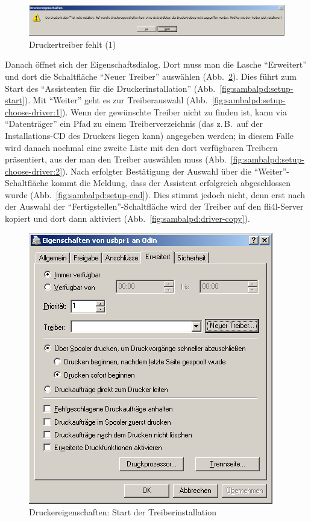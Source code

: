 \begin{figure}[hbt!]
\centering
\includegraphics[width=\columnwidth]{image008}
\caption{Druckertreiber fehlt (1)}
\label{fig:sambalpd:no-driver:1}
\end{figure}

Danach öffnet sich der Eigenschaftsdialog. Dort muss man
die Lasche ``Erweitert'' und dort die Schaltfläche ``Neuer Treiber'' auswählen
(Abb.~\ref{fig:sambalpd:props-start-setup}). Dies führt zum Start des
``Assistenten für die Druckerinstallation''
(Abb.~\ref{fig:sambalpd:setup-start}). Mit ``Weiter'' geht es zur
Treiberauswahl (Abb.~\ref{fig:sambalpd:setup-choose-driver:1}). Wenn der
gewünschte Treiber nicht zu finden ist, kann via ``Datenträger'' ein Pfad zu
einem Treiberverzeichnis (das z.\,B.\ auf der Installations-CD des Druckers
liegen kann) angegeben werden; in diesem Falle wird danach nochmal eine zweite
Liste mit den dort verfügbaren Treibern präsentiert, aus der man den Treiber
auswählen muss (Abb.~\ref{fig:sambalpd:setup-choose-driver:2}). Nach erfolgter
Bestätigung der Auswahl über die ``Weiter''-Schaltfläche kommt die Meldung,
dass der Assistent erfolgreich abgeschlossen wurde
(Abb.~\ref{fig:sambalpd:setup-end}). Dies stimmt jedoch nicht, denn erst nach
der Auswahl der ``Fertigstellen''-Schaltfläche wird der Treiber auf den
fli4l-Server kopiert und dort dann aktiviert
(Abb.~\ref{fig:sambalpd:driver-copy}).

\begin{figure}[hbt!]
\centering
\includegraphics[width=0.8\columnwidth]{image009}
\caption{Druckereigenschaften: Start der Treiberinstallation}
\label{fig:sambalpd:props-start-setup}
\end{figure}

